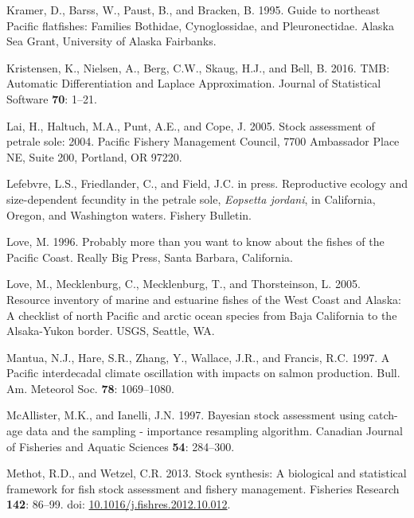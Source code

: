 \documentclass[12pt,]{article}
\begin{document}
\hypertarget{ref-kramer_guide_1995}{}
Kramer, D., Barss, W., Paust, B., and Bracken, B. 1995. Guide to
northeast Pacific flatfishes: Families Bothidae, Cynoglossidae, and
Pleuronectidae. Alaska Sea Grant, University of Alaska Fairbanks.

\hypertarget{ref-kristensen_tmb:_2016}{}
Kristensen, K., Nielsen, A., Berg, C.W., Skaug, H.J., and Bell, B. 2016.
TMB: Automatic Differentiation and Laplace Approximation. Journal of
Statistical Software \textbf{70}: 1--21.

\hypertarget{ref-lai_stock_2005}{}
Lai, H., Haltuch, M.A., Punt, A.E., and Cope, J. 2005. Stock assessment
of petrale sole: 2004. Pacific Fishery Management Council, 7700
Ambassador Place NE, Suite 200, Portland, OR 97220.

\hypertarget{ref-lefebvre_reproductive_nodate}{}
Lefebvre, L.S., Friedlander, C., and Field, J.C. in press. Reproductive
ecology and size-dependent fecundity in the petrale sole, \emph{Eopsetta
jordani}, in California, Oregon, and Washington waters. Fishery
Bulletin.

\hypertarget{ref-love_milton_probably_1996}{}
Love, M. 1996. Probably more than you want to know about the fishes of
the Pacific Coast. Really Big Press, Santa Barbara, California.

\hypertarget{ref-love_milton_resource_2005}{}
Love, M., Mecklenburg, C., Mecklenburg, T., and Thorsteinson, L. 2005.
Resource inventory of marine and estuarine fishes of the West Coast and
Alaska: A checklist of north Pacific and arctic ocean species from Baja
California to the Alsaka-Yukon border. USGS, Seattle, WA.

\hypertarget{ref-mantua_pacific_1997}{}
Mantua, N.J., Hare, S.R., Zhang, Y., Wallace, J.R., and Francis, R.C.
1997. A Pacific interdecadal climate oscillation with impacts on salmon
production. Bull. Am. Meteorol Soc. \textbf{78}: 1069--1080.

\hypertarget{ref-mcallister_bayesian_1997}{}
McAllister, M.K., and Ianelli, J.N. 1997. Bayesian stock assessment
using catch-age data and the sampling - importance resampling algorithm.
Canadian Journal of Fisheries and Aquatic Sciences \textbf{54}:
284--300.

\hypertarget{ref-methot_stock_2013}{}
Methot, R.D., and Wetzel, C.R. 2013. Stock synthesis: A biological and
statistical framework for fish stock assessment and fishery management.
Fisheries Research \textbf{142}: 86--99. doi:
\href{https://doi.org/10.1016/j.fishres.2012.10.012}{10.1016/j.fishres.2012.10.012}.
\end{document}
